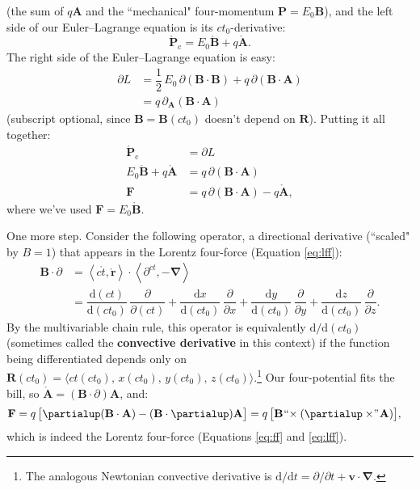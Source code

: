 \documentclass[12pt]{article}
\renewcommand{\vv}[1]{\mathbf{#1}}
\newcommand{\dd}[1]{\mathrm{d}#1}
\newcommand{\del}{\boldsymbol{\nabla}}
\begin{document}
(the sum of $q \vv A$ and the ``mechanical" four-momentum $\vv P = E_0 \vv B$), and the left side of our Euler--Lagrange equation is its $ct_0$-derivative:
\begin{equation*}
\mathring{\vv P}_\textrm{c}  =  E_0 \mathring{\vv B} + q \mathring{\vv A} .
\end{equation*}
The right side of the Euler--Lagrange equation is easy:
\begin{equation*}
\begin{split}
\partialup L &= \dfrac{1}{2} \, E_0 \, \partialup (\vv B \cdot \vv B) + q \, \partialup (\vv B \cdot \vv A) \\[2pt]
&= q \, \partialup_{\vv A} (\vv B \cdot \vv A)
\end{split}
\end{equation*}
(subscript optional, since $\vv B = \vv B(ct_0)$ doesn't depend on $\vv R$). Putting it all together:
\begin{equation*}
\begin{split}
\mathring{\vv P}_\textrm{c} &= \partialup L \\[2pt]
E_0 \mathring{\vv B} + q \mathring{\vv A} &= q \, \partialup (\vv B \cdot \vv A) \\[3pt]
\vv F &= q \, \partialup (\vv B \cdot \vv A) - q \mathring{\vv A} ,
\end{split}
\end{equation*}
where we've used $\vv F = E_0 \mathring{\vv B}$.

One more step. Consider the following operator, a directional derivative (``scaled" by $B = 1$) that appears in the Lorentz four-force (Equation \ref{eq:lff}):
\begin{equation*}
\begin{split}
\vv B \cdot \partialup &= \left \langle c \mathring{t}, \mathring{\vv r} \right \rangle \cdot \left \langle \partial^{ct}, - \del \right \rangle \\[4pt]
&= \dfrac{\dd (ct)}{\dd (ct_0)} \, \dfrac{\partial}{\partial (ct)} + \dfrac{\dd x}{\dd (ct_0)} \, \dfrac{\partial}{\partial x} +  \dfrac{\dd y}{\dd (ct_0)} \, \dfrac{\partial}{\partial y} + \dfrac{\dd z}{\dd (ct_0)} \, \dfrac{\partial}{\partial z} .
\end{split}
\end{equation*}
By the multivariable chain rule, this operator is equivalently $\dd / \dd (ct_0)$ (sometimes called the \textbf{convective derivative} in this context) if the function being differentiated depends only on ${\vv R (ct_0) = \langle ct (ct_0), \, x (ct_0), \, y (ct_0), \, z (ct_0) \rangle}$.\footnote{The analogous Newtonian convective derivative is $\dd / \dd t = \partial / \partial t + \vv v \cdot \del$.} Our four-potential fits the bill, so $\mathring{\vv A} = (\vv B \cdot \partialup) \vv A $, and:
\begin{equation*}
\begin{split}
\vv F &= q \, \bigl[ \partialup (\vv B \cdot \vv A) - (\vv B \cdot \partialup) \vv A \bigr] = q \, \bigl[ \vv B \mkern1mu `` \mkern-4mu \times (\partialup \times \mkern-4mu " \mkern1mu \vv A) \bigr] ,
\end{split}
\end{equation*}
which is indeed the Lorentz four-force (Equations \ref{eq:ff} and \ref{eq:lff}).
\end{document}
